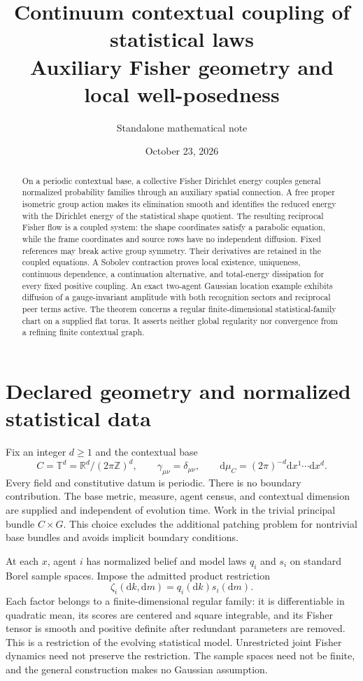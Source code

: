 \documentclass[11pt]{article}
\title{Continuum contextual coupling of statistical laws\\
\large Auxiliary Fisher geometry and local well-posedness}
\author{Standalone mathematical note}
\date{October 23, 2026}
\newcommand{\R}{\mathbb R}
\newcommand{\T}{\mathbb T}
\newcommand{\dd}{\mathrm d}
\begin{document}
\maketitle
\begin{abstract}
On a periodic contextual base, a collective Fisher Dirichlet energy couples general normalized probability families through an auxiliary spatial connection. A free proper isometric group action makes its elimination smooth and identifies the reduced energy with the Dirichlet energy of the statistical shape quotient. The resulting reciprocal Fisher flow is a coupled system: the shape coordinates satisfy a parabolic equation, while the frame coordinates and source rows have no independent diffusion. Fixed references may break active group symmetry. Their derivatives are retained in the coupled equations. A Sobolev contraction proves local existence, uniqueness, continuous dependence, a continuation alternative, and total-energy dissipation for every fixed positive coupling. An exact two-agent Gaussian location example exhibits diffusion of a gauge-invariant amplitude with both recognition sectors and reciprocal peer terms active. The theorem concerns a regular finite-dimensional statistical-family chart on a supplied flat torus. It asserts neither global regularity nor convergence from a refining finite contextual graph.
\end{abstract}

\section{Declared geometry and normalized statistical data}

Fix an integer $d\geq1$ and the contextual base
\begin{equation}
 C=\T^d=\R^d/(2\pi\mathbb Z)^d,\qquad
 \gamma_{\mu\nu}=\delta_{\mu\nu},\qquad
 \dd\mu_C=(2\pi)^{-d}\dd x^1\cdots\dd x^d.
 \label{eq:base}
\end{equation}
Every field and constitutive datum is periodic. There is no boundary contribution. The base metric, measure, agent census, and contextual dimension are supplied and independent of evolution time. Work in the trivial principal bundle $C\times G$. This choice excludes the additional patching problem for nontrivial base bundles and avoids implicit boundary conditions.

At each $x$, agent $i$ has normalized belief and model laws $q_i$ and $s_i$ on standard Borel sample spaces. Impose the admitted product restriction
\begin{equation}
 \zeta_i(\dd k,\dd m)=q_i(\dd k)s_i(\dd m).
 \label{eq:product}
\end{equation}
Each factor belongs to a finite-dimensional regular family: it is differentiable in quadratic mean, its scores are centered and square integrable, and its Fisher tensor is smooth and positive definite after redundant parameters are removed. This is a restriction of the evolving statistical model. Unrestricted joint Fisher dynamics need not preserve the restriction. The sample spaces need not be finite, and the general construction makes no Gaussian assumption.
\end{document}
